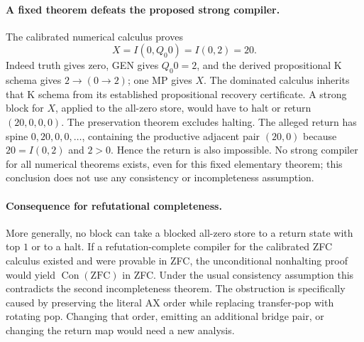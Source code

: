 \paragraph{A fixed theorem defeats the proposed strong compiler.}
The calibrated numerical calculus proves
\[
                   X=I(0,Q_0 0)=I(0,2)=20.
\]
Indeed truth gives zero, GEN gives $Q_0 0=2$, and the derived
propositional K schema gives $2\to(0\to2)$; one MP gives $X$.
The dominated calculus inherits that K schema from its established
propositional recovery certificate. A strong block for $X$, applied
to the all-zero store, would have to halt or return
$(20,0,0,0)$. The preservation theorem excludes halting. The alleged
return has spine $0,20,0,0,\ldots$, containing the productive adjacent
pair $(20,0)$ because $20=I(0,2)$ and $2>0$. Hence the return is
also impossible. No strong compiler for all numerical theorems exists,
even for this fixed elementary theorem; this conclusion does not use
any consistency or incompleteness assumption.

\paragraph{Consequence for refutational completeness.}
More generally, no block can take a blocked all-zero store to a
return state with top $1$ or to a halt. If a
refutation-complete compiler for the calibrated ZFC calculus existed
and were provable in ZFC, the unconditional nonhalting proof would
yield $\operatorname{Con}(\mathrm{ZFC})$ in ZFC. Under the usual
consistency assumption this contradicts the second incompleteness
theorem. The obstruction is specifically caused by preserving the
literal AX order while replacing transfer-pop with rotating pop.
Changing that order, emitting an additional bridge pair, or changing
the return map would need a new analysis.
